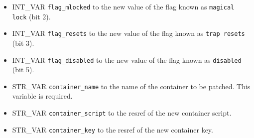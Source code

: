 \documentclass{article}
\def\t#1{{\tt #1}}
\begin{document}
\begin{itemize}
\item INT_VAR \verb+flag_mlocked+ to the new value of the flag known as \t{magical lock} (bit 2).
\item INT_VAR \verb+flag_resets+ to the new value of the flag known as \t{trap resets} (bit 3).
\item INT_VAR \verb+flag_disabled+ to the new value of the flag known as \t{disabled} (bit 5).
\item STR_VAR \verb+container_name+ to the name of the container to be patched. This variable is required.
\item STR_VAR \verb+container_script+ to the resref of the new container script.
\item STR_VAR \verb+container_key+ to the resref of the new container key.
\end{itemize}
\\
\end{document}
